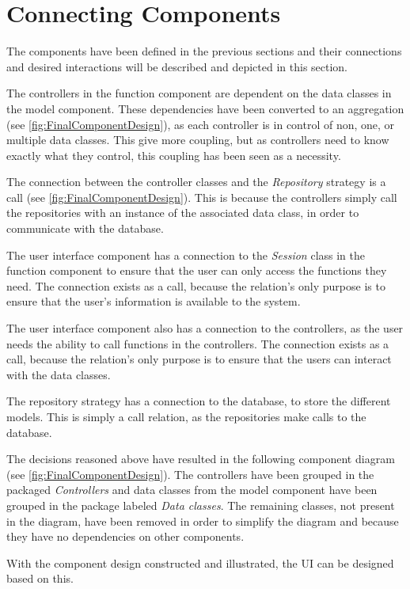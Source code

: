 \section{Connecting Components} \label{sc:connecting_components}
The components have been defined in the previous sections and their connections and desired interactions will be described and depicted in this section.
\par
The controllers in the function component are dependent on the data classes in the model component. These dependencies have been converted to an aggregation (see \autoref{fig:FinalComponentDesign}), as each controller is in control of non, one, or multiple data classes. This give more coupling, but as controllers need to know exactly what they control, this coupling has been seen as a necessity.
\par
The connection between the controller classes and the \textit{Repository} strategy is a call (see \autoref{fig:FinalComponentDesign}). This is because the controllers simply call the repositories with an instance of the associated data class, in order to communicate with the database.
\par
The user interface component has a connection to the \textit{Session} class in the function component to ensure that the user can only access the functions they need. The connection exists as a call, because the relation's only purpose is to ensure that the user's information is available to the system.
\par
The user interface component also has a connection to the controllers, as the user needs the ability to call functions in the controllers. The connection exists as a call, because the relation's only purpose is to ensure that the users can interact with the data classes.
\par
The repository strategy has a connection to the database, to store the different models. This is simply a call relation, as the repositories make calls to the database.
\par
The decisions reasoned above have resulted in the following component diagram (see \autoref{fig:FinalComponentDesign}). The controllers have been grouped in the packaged \textit{Controllers} and data classes from the model component have been grouped in the package labeled \textit{Data classes}. The remaining classes, not present in the diagram, have been removed in order to simplify the diagram and because they have no dependencies on other components.
\par
With the component design constructed and illustrated, the UI can be designed based on this.

